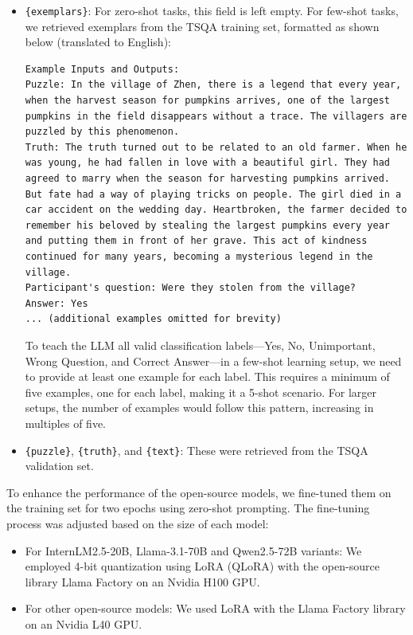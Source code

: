\begin{itemize}
    \item \texttt{\{exemplars\}}: For zero-shot tasks, this field is left empty. For few-shot tasks, we retrieved exemplars from the TSQA training set, formatted as shown below (translated to English):
\small{
\begin{verbatim}
Example Inputs and Outputs:
Puzzle: In the village of Zhen, there is a legend that every year, when the harvest season for pumpkins arrives, one of the largest pumpkins in the field disappears without a trace. The villagers are puzzled by this phenomenon.
Truth: The truth turned out to be related to an old farmer. When he was young, he had fallen in love with a beautiful girl. They had agreed to marry when the season for harvesting pumpkins arrived. But fate had a way of playing tricks on people. The girl died in a car accident on the wedding day. Heartbroken, the farmer decided to remember his beloved by stealing the largest pumpkins every year and putting them in front of her grave. This act of kindness continued for many years, becoming a mysterious legend in the village.
Participant's question: Were they stolen from the village?
Answer: Yes
... (additional examples omitted for brevity)
\end{verbatim}

To teach the LLM all valid classification labels—Yes, No, Unimportant, Wrong Question, and Correct Answer—in a few-shot learning setup, we need to provide at least one example for each label. This requires a minimum of five examples, one for each label, making it a 5-shot scenario. For larger setups, the number of examples would follow this pattern, increasing in multiples of five.
}
    \item \texttt{\{puzzle\}}, \texttt{\{truth\}}, and \texttt{\{text\}}: These were retrieved from the TSQA validation set.
\end{itemize}

To enhance the performance of the open-source models, we fine-tuned them on the training set for two epochs using zero-shot prompting. The fine-tuning process was adjusted based on the size of each model:

\begin{itemize}
    \item For InternLM2.5-20B, Llama-3.1-70B and Qwen2.5-72B variants: We employed 4-bit quantization using LoRA (QLoRA) with the open-source library Llama Factory \cite{zheng2024llamafactory} on an Nvidia H100 GPU.
    \item For other open-source models: We used LoRA with the Llama Factory library on an Nvidia L40 GPU.
\end{itemize}

